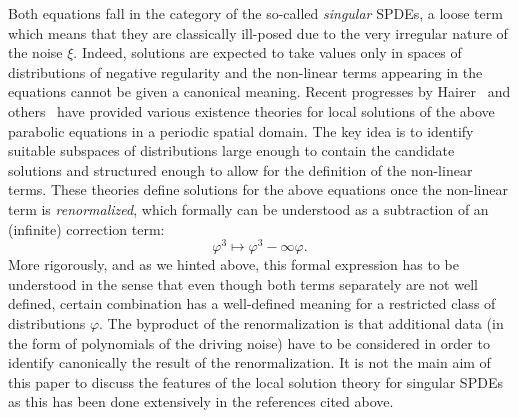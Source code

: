 \documentclass[a4paper,11pt]{article}
\numberwithin{equation}{section}
\newcommand{\8}{\infty}
\begin{document}
Both equations fall in the category of the so-called \emph{singular} SPDEs, a loose term which means that they are classically ill-posed due to the very irregular nature of the noise $\xi$. Indeed, solutions are expected to take values only in spaces of distributions of negative regularity and the non-linear terms appearing in the equations cannot be given a canonical meaning.   Recent progresses by Hairer~\cite{hairer_theory_2014} and others~\cite{GIP,kupiainen_renormalization_2016,otto_quasilinear_2016} have provided various existence theories for local solutions of the above parabolic equations in a periodic spatial domain. The key idea is to identify suitable subspaces of distributions large enough to contain the candidate solutions and structured enough to allow for the definition of the non-linear terms.  These theories define solutions for the above equations once the non-linear term is \emph{renormalized}, which formally can be understood as a subtraction of an (infinite) correction term:
$$
\varphi^3 \mapsto \varphi^3 - \infty \varphi.
$$
More rigorously, and as we hinted above, this formal expression has to be understood in the sense that even though both terms separately are not well defined, certain combination has a well-defined meaning for a restricted class of distributions $\varphi$. The byproduct of the renormalization is that additional data (in the form of polynomials of the driving noise) have to be considered in order to identify canonically the result of the renormalization. 
It is not the main aim of this paper to discuss the features  of the local solution theory for singular SPDEs as this has been done extensively in the references cited above. 
\end{document}
